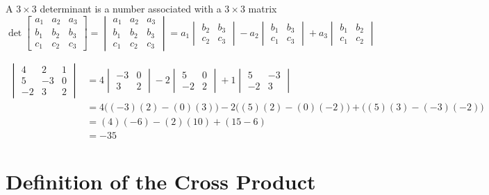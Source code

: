 \documentclass{ximera}
\begin{document}
\begin{definition}
A $3\times 3$ determinant is a number associated with a $3\times 3$ matrix
$$\det{\begin{bmatrix}
a_1 & a_2 & a_3\\
b_1 & b_2 &b_3\\
c_1 &c_2 &c_3
\end{bmatrix}}=
\begin{vmatrix}
a_1 & a_2 & a_3\\
b_1 & b_2 &b_3\\
c_1 &c_2 &c_3
\end{vmatrix} =a_1
\begin{vmatrix}
b_2 & b_3\\
c_2 & c_3
\end{vmatrix} -a_2
\begin{vmatrix}
b_1 & b_3\\
c_1 & c_3
\end{vmatrix} +a_3
\begin{vmatrix}
b_1 & b_2\\
c_1 & c_2
\end{vmatrix}
$$
\end{definition}

\begin{example} 
\begin{align*}
\begin{vmatrix}
4 & 2 & 1\\
5 & -3 &0\\
-2 &3 &2
\end{vmatrix}&=4
\begin{vmatrix}
-3 & 0\\
3 & 2
\end{vmatrix} -2
\begin{vmatrix}
5 & 0\\
-2 & 2
\end{vmatrix} +1
\begin{vmatrix}
5 & -3\\
-2 & 3
\end{vmatrix}\\
&=4\Big ((-3)(2)-(0)(3)\Big)-2\Big((5)(2)-(0)(-2)\Big)+\Big((5)(3)-(-3)(-2)\Big)\\
&=(4)(-6)-(2)(10)+(15-6)\\
&=-35
\end{align*}
\end{example}

\section*{Definition of the Cross Product}
\end{document}
